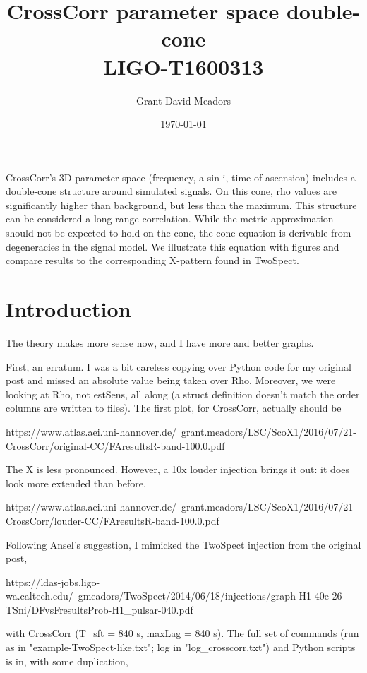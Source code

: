 \documentclass{article}
\begin{document}
\title{CrossCorr parameter space double-cone \\ 
LIGO-T1600313}
\author{Grant David Meadors}
\date{\today}

\maketitle

CrossCorr's 3D parameter space (frequency, a sin i, time of ascension) includes a double-cone structure around simulated signals. On this cone, rho values are significantly higher than background, but less than the maximum. This structure can be considered a long-range correlation. While the metric approximation should not be expected to hold on the cone, the cone equation is derivable from degeneracies in the signal model. We illustrate this equation with figures and compare results to the corresponding X-pattern found in TwoSpect.

\section{Introduction}


The theory makes more sense now, and I have more and better graphs.

First, an erratum. I was a bit careless copying over Python code for my
original post and missed an absolute value being taken over Rho.
Moreover, we were looking at Rho, not estSens, all along (a struct
definition doesn't match the order columns are written to files). The
first plot, for CrossCorr, actually should be

https://www.atlas.aei.uni-hannover.de/~grant.meadors/LSC/ScoX1/2016/07/21-CrossCorr/original-CC/FAresultsR-band-100.0.pdf

The X is less pronounced. However, a 10x louder injection brings it out:
it does look more extended than before,

https://www.atlas.aei.uni-hannover.de/~grant.meadors/LSC/ScoX1/2016/07/21-CrossCorr/louder-CC/FAresultsR-band-100.0.pdf

Following Ansel's suggestion, I mimicked the TwoSpect injection from the
original post,

https://ldas-jobs.ligo-wa.caltech.edu/~gmeadors/TwoSpect/2014/06/18/injections/graph-H1-40e-26-TSni/DFvsFresultsProb-H1_pulsar-040.pdf

with CrossCorr (T_sft = 840 s, maxLag = 840 s). The full set of commands
(run as in "example-TwoSpect-like.txt"; log in "log_crosscorr.txt") and
Python scripts is in, with some duplication,
\end{document}

